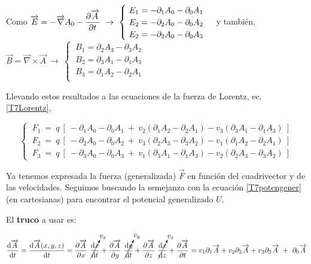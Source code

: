 \begin{small} Como $\overrightarrow E = -\overrightarrow \nabla A_0 - \displaystyle \pdv{\overrightarrow A}{t} \ \to \
\begin{cases}
\ E_1 = -\partial_1 A_0 - \partial_0 A_1 \\
\ E_2 = -\partial_2 A_0 - \partial_0 A_2 \\
\ E_2 = -\partial_2 A_0 - \partial_0 A_3 \\	
\end{cases}$ y también, 
$\overrightarrow B = \overrightarrow \nabla \times \overrightarrow A \ \to \
\begin{cases}
\ B_1= \partial_2 A_3 - \partial_3 A_2 \\	
\ B_2= \partial_3 A_1 - \partial_1 A_3 \\
\ B_3= \partial_1 A_2 - \partial_2 A_1 \\
\end{cases}$ \end{small}

\normalsize{Llevando} estos resultados a las ecuaciones de la fuerza de Lorentz, ec. \ref{T7Lorentz},

\begin{equation}
\label{T7LorentzPotenVector}	
\begin{cases}
\ F_1\ =\ q\ [\ -\partial_1 A_0 - \partial_0 A_1 \ +\  v_2(\partial_1 A_2 - \partial_2 A_1) - v_3(\partial_3 A_1 - \partial_1 A_3) \ ]	\\
\ F_2\ =\ q\ [\ -\partial_2 A_0 - \partial_0 A_2 \ +\  v_3(\partial_2 A_3 - \partial_3 A_2) - v_1(\partial_1 A_2 - \partial_2 A_1) \ ]	\\
\ F_3\ =\ q\ [\ -\partial_3 A_0 - \partial_0 A_3 \ +\  v_1(\partial_3 A_1 - \partial_1 A_3) - v_2(\partial_2 A_3 - \partial_3 A_2) \ ]	
\end{cases}
\end{equation}

Ya tenemos expresada la fuerza (generalizada) $\overrightarrow F$ en función del cuadrivector y de las velocidades. Seguimos buscando la semejanza con
	la ecuación \ref{T7potengener} (en cartesianas) para encontrar el potencial generalizado $U$.
	
El \textbf{truco} a usar es:
	
$ \displaystyle \dv{\overrightarrow A}{t} = \dv{\overrightarrow A(x,y,z)}{t}= 
\pdv{\overrightarrow A}{x} \ \cancelto{ v_x}{\dv{x}{t}}+
\pdv{\overrightarrow A}{y} \ \cancelto{ v_y}{\dv{y}{t}}+
\pdv{\overrightarrow A}{z} \ \cancelto{ v_z}{\dv{x}{z}} 
+ \pdv{\overrightarrow A}{t} =
v_1\partial_1 \overrightarrow A + v_2\partial_2 \overrightarrow A +v_3\partial_3 \overrightarrow A  \ + \ \partial_0 \overrightarrow A$


